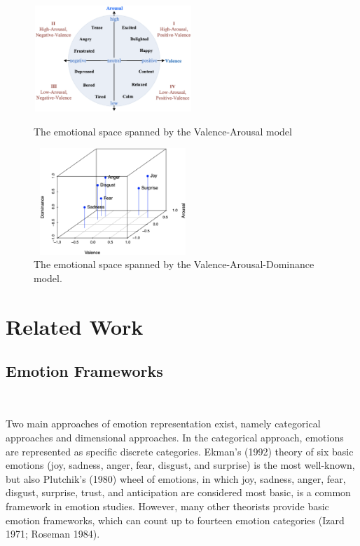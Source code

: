 \begin{figure}[htbp]
	\begin{minipage}[t]{0.5\linewidth}
		\centering
		\includegraphics[height=4cm,width=6cm]{figures/va_emotion.eps}
		\caption{The emotional space spanned by the Valence-Arousal model}\label{fig:va}
	\end{minipage}%
	\hfill
	\begin{minipage}[t]{0.5\linewidth}
		\centering
		\includegraphics[height=4cm,width=6cm]{figures/six_emotions_vad.eps}
		\caption{The emotional space spanned by the Valence-Arousal-Dominance model. }\label{fig:vad}
	\end{minipage}
\end{figure}


\section{Related Work}

\subsection{Emotion Frameworks}
\

Two main approaches of emotion representation exist, 
namely categorical approaches and dimensional approaches.
In the categorical approach, 
emotions are represented as specific discrete categories.
 Ekman’s (1992) theory of six basic emotions 
 (joy, sadness, anger, fear, disgust, and surprise) 
 is the most well-known, 
 but also Plutchik’s (1980) wheel of emotions, 
 in which joy, sadness, anger, fear, disgust, surprise, trust, 
 and anticipation are considered most basic,
is a common framework in emotion studies. 
However, 
many other theorists provide basic emotion frameworks, 
which can count up to fourteen emotion categories 
(Izard 1971; Roseman 1984).

